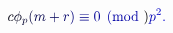 \documentclass[12pt]{article}
\begin{document}
\makeatletter
\renewcommand*{\@textcolor}[3]{%
  \protect\leavevmode
  \begingroup
    \color#1{#2}#3%
  \endgroup
}
\makeatother
\begin{displaymath}
\mathcolor[RGB]{0,0,15}{c} \mathcolor[RGB]{0,0,30}{\phi} _ { \mathcolor[RGB]{0,0,45}{p} } \mathcolor[RGB]{0,0,60}{(} \mathcolor[RGB]{0,0,75}{m} \mathcolor[RGB]{0,0,90}{+} \mathcolor[RGB]{0,0,105}{r} \mathcolor[RGB]{0,0,120}{)} \mathcolor[RGB]{0,0,135}{\equiv} \mathcolor[RGB]{0,0,150}{0} \mathcolor[RGB]{0,0,165}{\pmod} { \mathcolor[RGB]{0,0,180}{p} ^ { \mathcolor[RGB]{0,0,195}{2} } } \mathcolor[RGB]{0,0,210}{.}
\end{displaymath}
\end{document}
